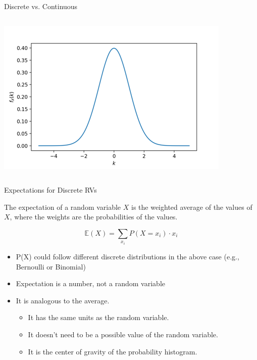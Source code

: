 \documentclass[aspectratio=169]{../latex_main/tntbeamer}  %
\begin{document}
\begin{frame}[c]{Discrete vs. Continuous}
\begin{columns}
\begin{column}{.5\textwidth}
	                    \centering
                        \includegraphics[scale=.5]{Bild5}
	        \end{column}
	    \end{columns}
	\end{frame}
	
	
	\begin{frame}{Expectations for Discrete RVs}
	
	    The expectation of a random variable $X$ is the weighted average of the values of $X$, where the weights are the probabilities of the values.
	    
	    \begin{equation}
	        \mathbb{E}(X) =  \sum_{x_i} P(X= x_i) \cdot x_i \nonumber
	    \end{equation}
	    
	    \begin{itemize}
	        \item P(X) could follow different discrete distributions in the above case (e.g., Bernoulli or Binomial)
	    \end{itemize}

	    \begin{itemize}
	                \item Expectation is a number, not a random variable
	                \item It is analogous to the average.
	                \begin{itemize}
	                    \item It has the same units as the random variable.
	                    \item It doesn’t need to be a possible value of the random variable.
	                    \item It is the center of gravity of the probability histogram.
	                \end{itemize}
	    \end{itemize}

	\end{frame}
	
\end{document}
